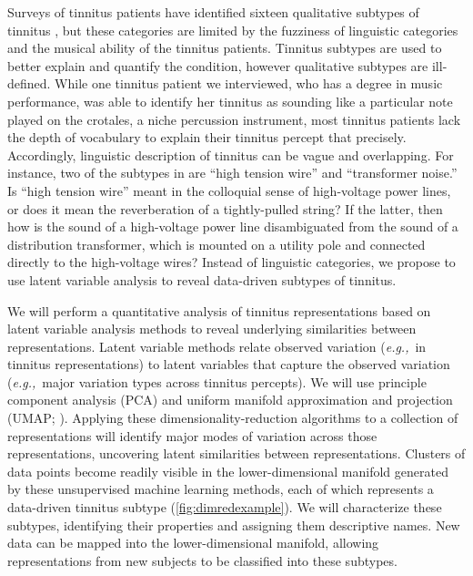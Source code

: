 \documentclass[11pt, notitlepage]{article} %
\def\eg{{\emph{e.g.,}}~}
\begin{document}
Surveys of tinnitus patients have identified sixteen qualitative subtypes of tinnitus
\cite{vajsakovicPrinciplesMethodsPsychoacoustic2021,meikleTinnitusArchiveArchive2004,stoufferCharacterizationTinnitusTinnitus1990},
but these categories are limited by the fuzziness of linguistic categories and the musical ability of the tinnitus patients.
Tinnitus subtypes are used to better explain and quantify the condition,
however qualitative subtypes are ill-defined.
While one tinnitus patient we interviewed, who has a degree in music performance,
was able to identify her tinnitus as sounding like a particular note played on the crotales,
a niche percussion instrument,
most tinnitus patients lack the depth of vocabulary to explain their tinnitus percept that precisely.
Accordingly, linguistic description of tinnitus can be vague and overlapping.
For instance, two of the subtypes in \cite{vajsakovicPrinciplesMethodsPsychoacoustic2021} are ``high tension wire'' and ``transformer noise.''
Is ``high tension wire'' meant in the colloquial sense of high-voltage power lines,
or does it mean the reverberation of a tightly-pulled string?
If the latter, then how is the sound of a high-voltage power line
disambiguated from the sound of a distribution transformer,
which is
mounted on a utility pole and connected directly to the high-voltage wires?
Instead of linguistic categories, we propose to use latent variable analysis
to reveal data-driven subtypes of tinnitus.

We will perform a quantitative analysis of tinnitus representations based on latent variable analysis methods
to reveal underlying similarities between representations.
Latent variable methods relate observed variation (\eg in tinnitus representations)
to latent variables that capture the observed variation (\eg major variation types across tinnitus percepts).
We will use principle component analysis (PCA) and uniform manifold approximation and projection (UMAP; \cite{mcinnesUMAPUniformManifold2020}).
Applying these dimensionality-reduction algorithms to a collection of representations
will identify major modes of variation across those representations,
uncovering latent similarities between representations.
Clusters of data points become readily visible in the lower-dimensional manifold generated
by these unsupervised machine learning methods, each of which represents
a data-driven tinnitus subtype (\autoref{fig:dimredexample}).
We will characterize these subtypes, identifying their properties and assigning them descriptive names.
New data can be mapped into the lower-dimensional manifold,
allowing representations from new subjects to be classified into these subtypes.
\end{document}
